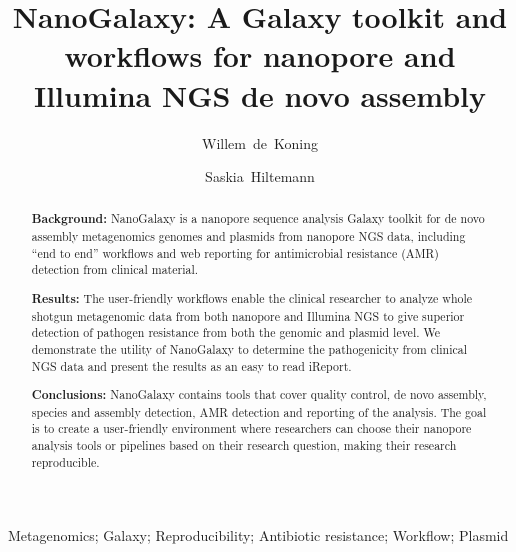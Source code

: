 \documentclass[a4paper,num-refs]{oup-contemporary}
\title{NanoGalaxy: A Galaxy toolkit and workflows for nanopore and Illumina NGS de novo assembly}
\author[1,\authfn{1},\authfn{2}]{Willem~de~Koning}
\author[2,\authfn{1},\authfn{2}]{Saskia~Hiltemann}
\affil[1]{Erasmus Medical Center, Department of Pathology, Wytemaweg 80, 3015 CN, Rotterdam, The Netherlands}
\affil[2]{Second Institution}
\begin{document}
\begin{frontmatter}
\maketitle
\begin{abstract}

\textbf{Background:} NanoGalaxy is a nanopore sequence analysis Galaxy toolkit for de novo assembly metagenomics genomes and plasmids from nanopore NGS data, including “end to end” workflows and web reporting for antimicrobial resistance (AMR) detection from clinical material.

\textbf{Results:} The user-friendly workflows enable the clinical researcher to analyze whole shotgun metagenomic data from both nanopore and Illumina NGS to give superior detection of pathogen resistance from both the genomic and plasmid level.  We demonstrate the utility of NanoGalaxy to determine the pathogenicity from clinical NGS data and present the results as an easy to read iReport.

\textbf{Conclusions:} NanoGalaxy contains tools that cover quality control, de novo assembly, species and assembly detection, AMR detection and reporting of the analysis. The goal is to create a user-friendly environment where researchers can choose their nanopore analysis tools or pipelines based on their research question, making their research reproducible.
\end{abstract}

\begin{keywords}
Metagenomics; Galaxy; Reproducibility; Antibiotic resistance; Workflow; Plasmid
\end{keywords}
\end{frontmatter}

\end{document}
